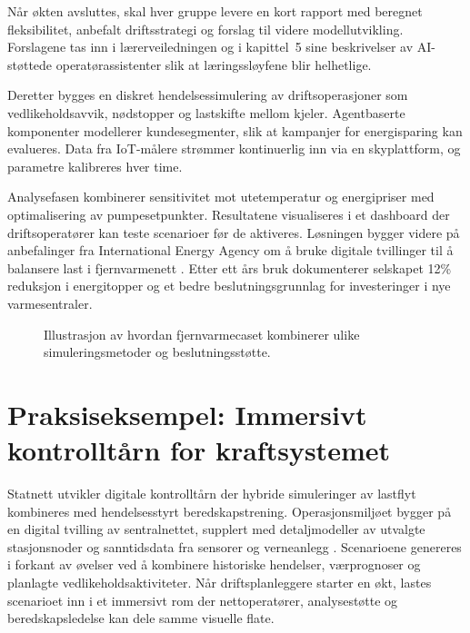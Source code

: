 Når økten avsluttes, skal hver gruppe levere en kort rapport med beregnet fleksibilitet, anbefalt driftsstrategi og forslag til videre modellutvikling. Forslagene tas inn i lærerveiledningen og i kapittel~5 sine beskrivelser av AI-støttede operatørassistenter slik at læringssløyfene blir helhetlige.

Deretter bygges en diskret hendelsessimulering av driftsoperasjoner som vedlikeholdsavvik, nødstopper og lastskifte mellom kjeler. Agentbaserte komponenter modellerer kundesegmenter, slik at kampanjer for energisparing kan evalueres. Data fra IoT-målere strømmer kontinuerlig inn via en skyplattform, og parametre kalibreres hver time.

Analysefasen kombinerer sensitivitet mot utetemperatur og energipriser med optimalisering av pumpesetpunkter. Resultatene visualiseres i et dashboard der driftsoperatører kan teste scenarioer før de aktiveres. Løsningen bygger videre på anbefalinger fra International Energy Agency om å bruke digitale tvillinger til å balansere last i fjernvarmenett \citep{iea2021district}. Etter ett års bruk dokumenterer selskapet 12\% reduksjon i energitopper og et bedre beslutningsgrunnlag for investeringer i nye varmesentraler.

\begin{figure}[htbp]
    \centering
    \caption{Illustrasjon av hvordan fjernvarmecaset kombinerer ulike simuleringsmetoder og beslutningsstøtte.}
    \label{fig:kap04-fjernvarmecase}
\end{figure}

\section{Praksiseksempel: Immersivt kontrolltårn for kraftsystemet}
Statnett utvikler digitale kontrolltårn der hybride simuleringer av lastflyt kombineres med hendelsesstyrt beredskapstrening. Operasjonsmiljøet bygger på en digital tvilling av sentralnettet, supplert med detaljmodeller av utvalgte stasjonsnoder og sanntidsdata fra sensorer og verneanlegg \citep{statnett2024kontrolltarn}. Scenarioene genereres i forkant av øvelser ved å kombinere historiske hendelser, værprognoser og planlagte vedlikeholdsaktiviteter. Når driftsplanleggere starter en økt, lastes scenarioet inn i et immersivt rom der nettoperatører, analysestøtte og beredskapsledelse kan dele samme visuelle flate.

